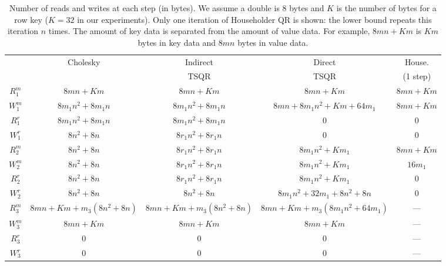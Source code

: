 \documentclass[10pt, conference, compsocconf]{IEEEtran}
\begin{document}
\begin{table*}[tbp]
\setlength{\extrarowheight}{1.5pt}
\centering
\caption{Number of reads and writes at each step (in bytes).  We assume a double is 8 bytes and $K$ is the number of bytes for a row key ($K = 32$ in our experiments).  Only one iteration of Householder QR is shown: the lower bound repeats this iteration $n$ times.  The amount of key data is separated from the amount of value data.  For example, $8mn + Km$ is $Km$ bytes in key data and $8mn$ bytes in value data.}
\begin{tabular}{c @{\qquad} c c c c}
\toprule
 & Cholesky & Indirect & Direct & House. \\
 &                   & TSQR    & TSQR & (1 step) \\            
 \midrule
$R_1^m$ & $8mn + Km$ & $8mn + Km$ & $8mn + Km$ & $8mn +Km$ \\
$W_1^m$ & $8m_1n^2 + 8m_1n$ & $8m_1n^2 + 8m_1n$ & $8mn + 8m_1n^2 + Km + 64m_1$ & $8mn + Km$ \\

$R_1^r$ & $8m_1n^2 + 8m_1n$ & $8m_1n^2 + 8m_1n$ & $0$ & $0$\\
$W_1^r$ & $8n^2 + 8n$ & $8r_1n^2 + 8r_1n$ & $0$ & $0$\\

$R_2^m$ & $8n^2 + 8n$ & $8r_1n^2 + 8r_1n$ &  $8m_1n^2 + Km_1$ & $8mn + Km$ \\
$W_2^m$ & $8n^2 + 8n$ & $8r_1n^2 + 8r_1n$ & $8m_1n^2 + Km_1$ & $16m_1$\\

$R_2^r$ & $8n^2 + 8n$ & $8r_1n^2 + 8r_1n$ & $8m_1n^2 + Km_1$ & $0$ \\
$W_2^r$ & $8n^2 + 8n$ & $8n^2 + 8n$ & $8m_1n^2 + 32m_1 + 8n^2 + 8n$ & $0$ \\

$R_3^m$ & $8mn + Km + m_3(8n^2 + 8n)$ & $8mn + Km + m_3(8n^2 + 8n)$ & $8mn + Km + m_3(8m_1n^2 + 64m_1)$ & ---\\
$W_3^m$ & $8mn + Km$ & $8mn + Km$ & $8mn + Km$ & ---\\

$R_3^r$ & $0$ & $0$  & $0$ & --- \\ 
$W_3^r$ & $0$ & $0$ & $0$ & ---\\
\bottomrule
\end{tabular}
\label{tab:reads_writes}
\end{table*}
\end{document}
